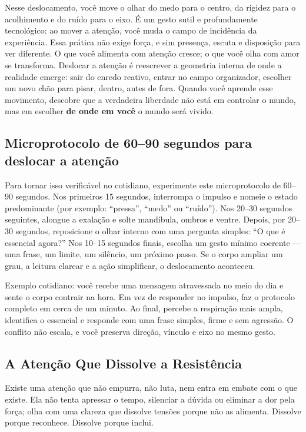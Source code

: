 \documentclass[12pt]{book}
\begin{document}
Nesse deslocamento, você move o olhar do medo para o centro, da rigidez para o acolhimento e do ruído para o eixo. É um gesto sutil e profundamente tecnológico: ao mover a atenção, você muda o campo de incidência da experiência. Essa prática não exige força, e sim presença, escuta e disposição para ver diferente. O que você alimenta com atenção cresce; o que você olha com amor se transforma. Deslocar a atenção é reescrever a geometria interna de onde a realidade emerge: sair do enredo reativo, entrar no campo organizador, escolher um novo chão para pisar, dentro, antes de fora. Quando você aprende esse movimento, descobre que a verdadeira liberdade não está em controlar o mundo, mas em escolher \textbf{de onde em você} o mundo será vivido.

\subsection*{Microprotocolo de 60--90 segundos para deslocar a atenção}

Para tornar isso verificável no cotidiano, experimente este microprotocolo de 60--90 segundos. Nos primeiros 15 segundos, interrompa o impulso e nomeie o estado predominante (por exemplo: \enquote{pressa}, \enquote{medo} ou \enquote{ruído}). Nos 20--30 segundos seguintes, alongue a exalação e solte mandíbula, ombros e ventre. Depois, por 20--30 segundos, reposicione o olhar interno com uma pergunta simples: \enquote{O que é essencial agora?} Nos 10--15 segundos finais, escolha um gesto mínimo coerente --- uma frase, um limite, um silêncio, um próximo passo. Se o corpo ampliar um grau, a leitura clarear e a ação simplificar, o deslocamento aconteceu.

Exemplo cotidiano: você recebe uma mensagem atravessada no meio do dia e sente o corpo contrair na hora. Em vez de responder no impulso, faz o protocolo completo em cerca de um minuto. Ao final, percebe a respiração mais ampla, identifica o essencial e responde com uma frase simples, firme e sem agressão. O conflito não escala, e você preserva direção, vínculo e eixo no mesmo gesto.

\subsection*{A Atenção Que Dissolve a Resistência}

Existe uma atenção que não empurra, não luta, nem entra em embate com o que existe. Ela não tenta apressar o tempo, silenciar a dúvida ou eliminar a dor pela força; olha com uma clareza que dissolve tensões porque não as alimenta. Dissolve porque reconhece. Dissolve porque inclui.
\end{document}
